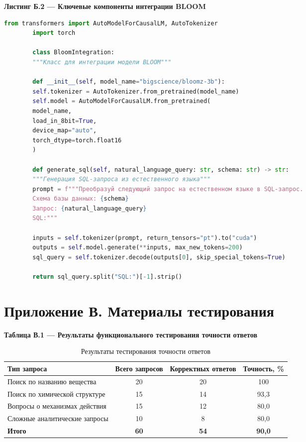 \documentclass[a4paper,14pt]{extarticle}
\begin{document}
	\begin{center}
		\textbf{Листинг Б.2 — Ключевые компоненты интеграции BLOOM}
	\end{center}
	
	\begin{lstlisting}[language=Python]
		from transformers import AutoModelForCausalLM, AutoTokenizer
		import torch
		
		class BloomIntegration:
		"""Класс для интеграции модели BLOOM"""
		
		def __init__(self, model_name="bigscience/bloomz-3b"):
		self.tokenizer = AutoTokenizer.from_pretrained(model_name)
		self.model = AutoModelForCausalLM.from_pretrained(
		model_name,
		load_in_8bit=True,
		device_map="auto",
		torch_dtype=torch.float16
		)
		
		def generate_sql(self, natural_language_query: str, schema: str) -> str:
		"""Генерация SQL-запроса из естественного языка"""
		prompt = f"""Преобразуй следующий запрос на естественном языке в SQL-запрос.
		Схема базы данных: {schema}
		Запрос: {natural_language_query}
		SQL:"""
		
		inputs = self.tokenizer(prompt, return_tensors="pt").to("cuda")
		outputs = self.model.generate(**inputs, max_new_tokens=200)
		sql_query = self.tokenizer.decode(outputs[0], skip_special_tokens=True)
		
		return sql_query.split("SQL:")[-1].strip()
	\end{lstlisting}
	
	\section*{Приложение В. Материалы тестирования}
	
	\begin{center}
		\textbf{Таблица В.1 — Результаты функционального тестирования точности ответов}
	\end{center}
	
	\begin{table}[h]
		\centering
		\fontsize{13pt}{15pt}\selectfont
		\begin{tabular}{|p{4cm}|c|c|c|}
			\hline
			\textbf{Тип запроса} & \textbf{Всего запросов} & \textbf{Корректных ответов} & \textbf{Точность, \%} \\
			\hline
			Поиск по названию вещества & 20 & 20 & 100 \\
			\hline
			Поиск по химической структуре & 15 & 14 & 93,3 \\
			\hline
			Вопросы о механизмах действия & 15 & 12 & 80,0 \\
			\hline
			Сложные аналитические запросы & 10 & 8 & 80,0 \\
			\hline
			\textbf{Итого} & \textbf{60} & \textbf{54} & \textbf{90,0} \\
			\hline
		\end{tabular}
		\caption{Результаты тестирования точности ответов}
	\end{table}
	
\end{document}
